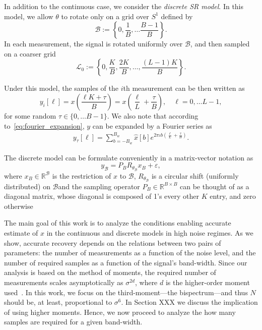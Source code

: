 \documentclass[english,12pt]{article}
\newcommand{\I}{\iota}
\newcommand{\tB}{B_w}
\numberwithin{equation}{section}
\begin{document}
In addition to the continuous case, we consider the \emph{discrete SR model}. 
In this model, we allow $\theta$ to rotate only on a grid over $S^1$ defined by  $$\mathcal{B}:=\left\{0,\frac{1}{B},\ldots\frac{B-1}{B}\right\}.$$
In each measurement, the signal is rotated uniformly over  $\mathcal{B}$, and then sampled on a coarser grid $$\mathcal{L}_0:=\left\{0,\frac{K}{B},\frac{2K}{B},\ldots,\frac{(L-1)K}{B}\right\}.$$ 

Under this model, the samples of the $i$th measurement can be then written as
\begin{equation}
y_i[\ell] = x\left(\frac{\ell K+\tau}{B}\right)=x\left(\frac{\ell}{L} + \frac{\tau}{B}\right), \quad \ell=0,\ldots L-1,
\end{equation}
for some random $\tau\in\{0,\ldots B-1\}$. 
We also note that according to~\eqref{eq:fourier_expansion},  $y$ can be expanded by a Fourier series as
\begin{eqnarray}
y_\tau[\ell] = \sum_{b=-\tB}^{\tB}\hat{x}[b]e^{2\pi\I b \left(\frac{\ell}{L} + \frac{\tau}{B}\right) }.
\end{eqnarray}

The discrete model can be formulate conveniently in a matrix-vector notation as  
\begin{equation} \label{eq:discrete}
y_{\mathcal{B}} = P_BR_{\theta_\mathcal{B}} x_B + \varepsilon,
\end{equation}
where $x_B\in\mathbb{R}^\mathcal{B}$ is the restriction of $x$ to $\mathcal{B}$, $R_{\theta_\mathcal{B}}$ is a circular shift (uniformly distributed) on $\mathcal{B} $and the sampling operator $P_B\in\mathbb{R}^{B\times B}$ can be thought of as a diagonal matrix, whose diagonal is composed of 1's every other $K$ entry, and zero otherwise

The main goal of this work is to analyze the conditions enabling accurate estimate of $x$ in the continuous and discrete models in high noise regimes. As we show, accurate recovery depends on the relations between two pairs of parameters: the number of measurements as a function of the noise level, and the number of required samples as a function of the signal's band-width. Since our analysis is based on the method of moments, the required number of measurements scales asymptotically as $\sigma^{2d}$, where $d$ is the higher-order moment used~\cite{abbe2018estimation,bandeira2017estimation}. 
In this work, we focus on the third-moment---the bispectrum---and thus $N$ should be, at least, proportional to $\sigma^6$. In Section XXX we discuss the implication of using higher moments. Hence, we now proceed to analyze the how many samples are required for a given band-width. 
\end{document}
